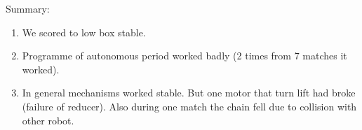 Summary:
\begin{enumerate}
	\item We scored to low box stable.
	
	\item Programme of autonomous period worked badly (2 times from 7 matches it worked).
	
	\item In general mechanisms worked stable. But one motor that turn lift had broke (failure of reducer). Also during one match the chain fell due to collision with other robot.
\end{enumerate}
\fillpage